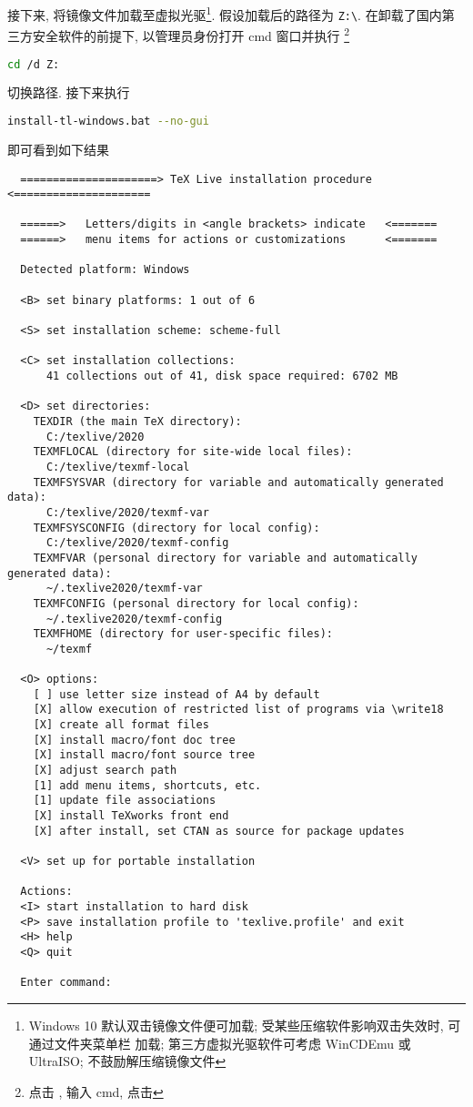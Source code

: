 接下来, 将镜像文件加载至虚拟光驱\footnote{Windows 10 默认双击镜像文件便可加载;
受某些压缩软件影响双击失效时,
可通过文件夹菜单栏
 加载;
第三方虚拟光驱软件可考虑 WinCDEmu 或 UltraISO;
不鼓励解压缩镜像文件}. 
假设加载后的路径为 \texttt{Z:\textbackslash}. 
在卸载了国内第三方安全软件的前提下,
以管理员身份打开 \textsf{cmd} 窗口并执行%
\footnote{点击 \keys{\faWindows},
输入 \textsf{cmd},
点击 \keys{\ctrl + \shift + \enter}}
\begin{lstlisting}[language = bash]
  cd /d Z:
\end{lstlisting}
切换路径. 
接下来执行
\begin{lstlisting}[language = bash]
  install-tl-windows.bat --no-gui
\end{lstlisting}
即可看到如下结果
\begin{lstlisting}
  =====================> TeX Live installation procedure <=====================
  
  ======>   Letters/digits in <angle brackets> indicate   <=======
  ======>   menu items for actions or customizations      <=======
  
  Detected platform: Windows
  
  <B> set binary platforms: 1 out of 6
  
  <S> set installation scheme: scheme-full
  
  <C> set installation collections:
      41 collections out of 41, disk space required: 6702 MB
  
  <D> set directories:
    TEXDIR (the main TeX directory):
      C:/texlive/2020
    TEXMFLOCAL (directory for site-wide local files):
      C:/texlive/texmf-local
    TEXMFSYSVAR (directory for variable and automatically generated data):
      C:/texlive/2020/texmf-var
    TEXMFSYSCONFIG (directory for local config):
      C:/texlive/2020/texmf-config
    TEXMFVAR (personal directory for variable and automatically generated data):
      ~/.texlive2020/texmf-var
    TEXMFCONFIG (personal directory for local config):
      ~/.texlive2020/texmf-config
    TEXMFHOME (directory for user-specific files):
      ~/texmf
  
  <O> options:
    [ ] use letter size instead of A4 by default
    [X] allow execution of restricted list of programs via \write18
    [X] create all format files
    [X] install macro/font doc tree
    [X] install macro/font source tree
    [X] adjust search path
    [1] add menu items, shortcuts, etc.
    [1] update file associations
    [X] install TeXworks front end
    [X] after install, set CTAN as source for package updates
  
  <V> set up for portable installation
  
  Actions:
  <I> start installation to hard disk
  <P> save installation profile to 'texlive.profile' and exit
  <H> help
  <Q> quit
  
  Enter command:
\end{lstlisting}
